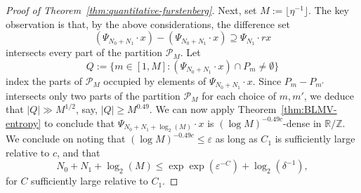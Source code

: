 \documentclass[10pt,a4paper]{amsart}
\begin{document}
\begin{proof}[Proof of Theorem~\ref{thm:quantitative-furstenberg}]
Next, set $M:=\lfloor \eta^{-1} \rfloor$.  The key observation is that, by the above considerations, the difference set
$$(\Psi_{N_0+N_1} \cdot x)-(\Psi_{N_0+N_1} \cdot x) \supseteq \Psi_{N_1} \cdot rx$$
intersects every part of the partition $\mathcal{P}_M$.  Let
$$Q:=\{m \in [1,M]: (\Psi_{N_0+N_1} \cdot x) \cap P_m \neq \emptyset\}$$
index the parts of $\mathcal{P}_M$ occupied by elements of $\Psi_{N_0+N_1} \cdot x$.  Since $P_m-P_{m'}$ intersects only two parts of the partition $\mathcal{P}_M$ for each choice of $m,m'$, we deduce that $|Q| \gg M^{1/2}$, say, $|Q| \geq M^{0.49}$.  We can now apply Theorem~\ref{thm:BLMV-entropy} to conclude that $\Psi_{N_0+N_1+\log_2(M)} \cdot x$
is $(\log M)^{-0.49c}$-dense in $\mathbb{R}/\mathbb{Z}$.  We conclude on noting that $(\log M)^{-0.49c}\leq \varepsilon$ as long as $C_1$ is sufficiently large relative to $c$, and that
$$N_0+N_1+\log_2(M) \leq \exp\exp(\varepsilon^{-C})+\log_2(\delta^{-1}),$$
for $C$ sufficiently large relative to $C_1$.
\end{proof}
\end{document}
